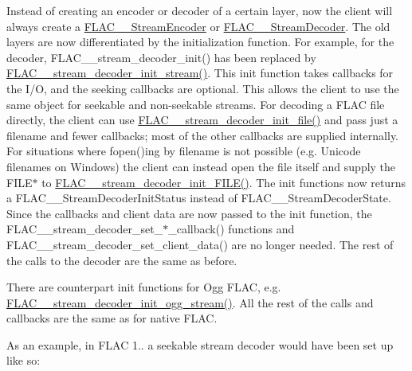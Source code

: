 Instead of creating an encoder or decoder of a certain layer, now the client will always create a \mbox{\hyperlink{struct_f_l_a_c_____stream_encoder}{F\+L\+A\+C\+\_\+\+\_\+\+Stream\+Encoder}} or \mbox{\hyperlink{struct_f_l_a_c_____stream_decoder}{F\+L\+A\+C\+\_\+\+\_\+\+Stream\+Decoder}}. The old layers are now differentiated by the initialization function. For example, for the decoder, F\+L\+A\+C\+\_\+\+\_\+stream\+\_\+decoder\+\_\+init() has been replaced by \mbox{\hyperlink{group__flac__stream__decoder_ga32c28a56a2bdfa2333edbd3d991894d7}{F\+L\+A\+C\+\_\+\+\_\+stream\+\_\+decoder\+\_\+init\+\_\+stream()}}. This init function takes callbacks for the I/O, and the seeking callbacks are optional. This allows the client to use the same object for seekable and non-\/seekable streams. For decoding a F\+L\+AC file directly, the client can use \mbox{\hyperlink{group__flac__stream__decoder_ga1692108a97012d1c5f79baf7df012c33}{F\+L\+A\+C\+\_\+\+\_\+stream\+\_\+decoder\+\_\+init\+\_\+file()}} and pass just a filename and fewer callbacks; most of the other callbacks are supplied internally. For situations where fopen()ing by filename is not possible (e.\+g. Unicode filenames on Windows) the client can instead open the file itself and supply the F\+I\+L\+E$\ast$ to \mbox{\hyperlink{group__flac__stream__decoder_ga38f9eb46bf112af205f86b4cbac9980c}{F\+L\+A\+C\+\_\+\+\_\+stream\+\_\+decoder\+\_\+init\+\_\+\+F\+I\+L\+E()}}. The init functions now returns a F\+L\+A\+C\+\_\+\+\_\+\+Stream\+Decoder\+Init\+Status instead of F\+L\+A\+C\+\_\+\+\_\+\+Stream\+Decoder\+State. Since the callbacks and client data are now passed to the init function, the F\+L\+A\+C\+\_\+\+\_\+stream\+\_\+decoder\+\_\+set\+\_\+$\ast$\+\_\+callback() functions and F\+L\+A\+C\+\_\+\+\_\+stream\+\_\+decoder\+\_\+set\+\_\+client\+\_\+data() are no longer needed. The rest of the calls to the decoder are the same as before.

There are counterpart init functions for Ogg F\+L\+AC, e.\+g. \mbox{\hyperlink{group__flac__stream__decoder_ga78bf285b54e5aaee73a214c108683a72}{F\+L\+A\+C\+\_\+\+\_\+stream\+\_\+decoder\+\_\+init\+\_\+ogg\+\_\+stream()}}. All the rest of the calls and callbacks are the same as for native F\+L\+AC.

As an example, in F\+L\+AC 1.. a seekable stream decoder would have been set up like so\+:


